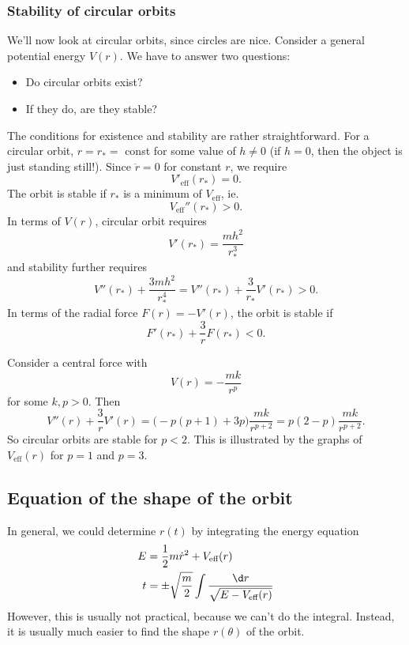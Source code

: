 \documentclass[a4paper]{article}
\begin{document}
\subsubsection*{Stability of circular orbits}
We'll now look at circular orbits, since circles are nice. Consider a general potential energy $V(r)$. We have to answer two questions:
\begin{itemize}
  \item Do circular orbits exist?
  \item If they do, are they stable?
\end{itemize}

The conditions for existence and stability are rather straightforward. For a circular orbit, $r = r_* =$ const for some value of $h\not= 0$ (if $h = 0$, then the object is just standing still!). Since $\ddot{r} = 0$ for constant $r$, we require
\[
  V'_{\text{eff}}(r_*) = 0.
\]
The orbit is stable if $r_*$ is a minimum of $V_{\text{eff}}$, ie.
\[
  V_{\text{eff}}''(r_*) > 0.
\]
In terms of $V(r)$, circular orbit requires
\[
  V'(r_*) = \frac{mh^2}{r_*^3}
\]
and stability further requires
\[
  V''(r_*) + \frac{3mh^2}{r_*^4} = V''(r_*) + \frac{3}{r_*}V'(r_*) > 0.
\]
In terms of the radial force $F(r) = -V'(r)$, the orbit is stable if
\[
  F'(r_*) + \frac{3}{r}F(r_*) < 0.
\]
\begin{eg}
  Consider a central force with
  \[
    V(r) = -\frac{mk}{r^p}
  \]
  for some $k, p > 0$. Then
  \[
    V''(r) + \frac{3}{r}V'(r) = \big( -p(p + 1) + 3p\big)\frac{mk}{r^{p + 2}} = p(2-p)\frac{mk}{r^{p + 2}}.
  \]
  So circular orbits are stable for $p < 2$. This is illustrated by the graphs of $V_{\text{eff}}(r)$ for $p = 1$ and $p = 3$.
  \begin{center}
  \end{center}
\end{eg}

\subsection{Equation of the shape of the orbit}
In general, we could determine $r(t)$ by integrating the energy equation
\begin{align*}
  E &= \frac{1}{2}m\dot{r}^2 + V_{\text{eff}}(r)\\
  t &= \pm \sqrt{\frac{m}{2}}\int \frac{\d r}{\sqrt{E - V_{\text{eff}}(r)}}
\end{align*}
However, this is usually not practical, because we can't do the integral. Instead, it is usually much easier to find the shape $r(\theta)$ of the orbit.
\end{document}
